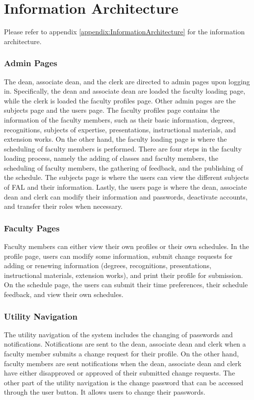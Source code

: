 \section{Information Architecture}
Please refer to appendix \ref{appendix:InformationArchitecture} for the information architecture.

\subsubsection{Admin Pages}
The dean, associate dean, and the clerk are directed to admin pages upon logging in. Specifically, the dean and associate dean are loaded the faculty loading page, while the clerk is loaded the faculty profiles page. Other admin pages are the subjects page and the users page. The faculty profiles page contains the information of the faculty members, such as their basic information, degrees, recognitions, subjects of expertise, presentations, instructional materials, and extension works. On the other hand, the faculty loading page is where the scheduling of faculty members is performed. There are four steps in the faculty loading process, namely the adding of classes and faculty members, the scheduling of faculty members, the gathering of feedback, and the publishing of the schedule. The subjects page is where the users can view the different subjects of FAL and their information. Lastly, the users page is where the dean, associate dean and clerk can modify their information and passwords, deactivate accounts, and transfer their roles when necessary.

\subsubsection{Faculty Pages}
Faculty members can either view their own profiles or their own schedules. In the profile page, users can modify some information, submit change requests for adding or renewing information (degrees, recognitions, presentations, instructional materials, extension works), and print their profile for submission. On the schedule page, the users can submit their time preferences, their schedule feedback, and view their own schedules.

\subsubsection{Utility Navigation}
The utility navigation of the system includes the changing of passwords and notifications. Notifications are sent to the dean, associate dean and clerk when a faculty member submits a change request for their profile. On the other hand, faculty members are sent notifications when the dean, associate dean and clerk have either disapproved or approved of their submitted change requests. The other part of the utility navigation is the change password that can be accessed through the user button. It allows users to change their passwords.

